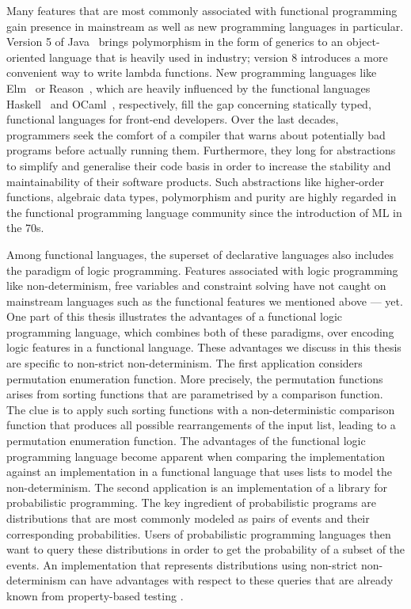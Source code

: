 %


Many features that are most commonly associated with functional programming gain presence in mainstream as well as new programming languages in particular.
Version 5 of Java~\citep{arnold2005java} brings polymorphism in the form of generics to an object-oriented language that is heavily used in industry; version 8 introduces a more convenient way to write lambda functions.
New programming languages like Elm~\citep{czaplicki2012elm} or Reason~\citep{2019reasonml}, which are heavily influenced by the functional languages Haskell~\citep{jones2002haskell} and OCaml~\citep{minsky2013real}, respectively, fill the gap concerning statically typed, functional languages for front-end developers.
Over the last decades, programmers seek the comfort of a compiler that warns about potentially bad programs before actually running them.
Furthermore, they long for abstractions to simplify and generalise their code basis in order to increase the stability and maintainability of their software products.
Such abstractions like higher-order functions, algebraic data types, polymorphism and purity are highly regarded in the functional programming language community since the introduction of ML in the 70s.

Among functional languages, the superset of declarative languages also includes the paradigm of logic programming.
Features associated with logic programming like non-determinism, free variables and constraint solving have not caught on mainstream languages such as the functional features we mentioned above --- yet.
One part of this thesis illustrates the advantages of a functional logic programming language, which combines both of these paradigms, over encoding logic features in a functional language.
These advantages we discuss in this thesis are specific to non-strict non-determinism.
The first application considers permutation enumeration function.
More precisely, the permutation functions arises from sorting functions that are parametrised by a comparison function.
The clue is to apply such sorting functions with a non-deterministic comparison function that produces all possible rearrangements of the input list, leading to a permutation enumeration function.
The advantages of the functional logic programming language become apparent when comparing the implementation against an implementation in a functional language that uses lists to model the non-determinism.
The second application is an implementation of a library for probabilistic programming.
The key ingredient of probabilistic programs are distributions that are most commonly modeled as pairs of events and their corresponding probabilities.
Users of probabilistic programming languages then want to query these distributions in order to get the probability of a subset of the events.
An implementation that represents distributions using non-strict non-determinism can have advantages with respect to these queries that are already known from property-based testing \citep{christiansen2008easycheck,runciman2008smallcheck}.

